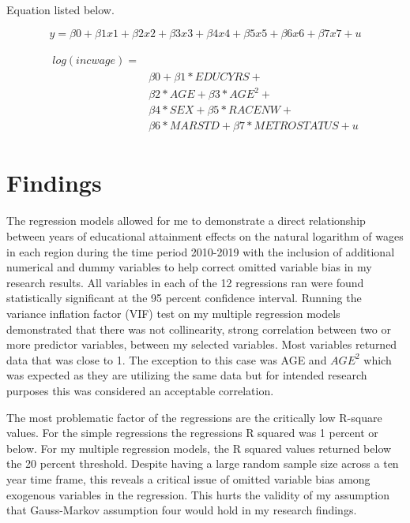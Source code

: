\documentclass[12pt, English]{article}
\begin{document}
Equation listed below. 

\begin{equation}
    y = \beta0 + \beta1x1+ \beta2x2+ \beta3x3 + \beta4x4 + \beta5x5 + \beta6x6 + \beta7x7 + u 
\end{equation}

\begin{equation}
\begin{aligned}
\begin{split}
log(incwage) = \\
&   \beta0 + \beta1*EDUCYRS + \\
&  \beta2*AGE+ \beta3*AGE^2 + \\
&  \beta4*SEX + \beta5*RACENW + \\
&  \beta6*MARSTD +\beta7*METROSTATUS + u
\end{split}
\end{aligned}
\end{equation}

\section{Findings}
The regression models allowed for me to demonstrate a direct relationship between years of educational attainment effects on the natural logarithm of wages in each region during the time period 2010-2019 with the inclusion of additional numerical and dummy variables to help correct omitted variable bias in my research results. All variables in each of the 12 regressions ran were found statistically significant at the 95 percent confidence interval. Running the variance inflation factor (VIF) test on my multiple regression models demonstrated that there was not collinearity, strong correlation between two or more predictor variables, between my selected variables. Most variables returned data that was close to 1. The exception to this case was AGE and \begin{math} AGE^2 \end{math} which was expected as they are utilizing the same data but for intended research purposes this was considered an acceptable correlation.

The most problematic factor of the regressions are the critically low R-square values. For the simple regressions the regressions R squared was 1 percent or below. For my multiple regression models, the R squared values returned below the 20 percent threshold. Despite having a large random sample size across a ten year time frame, this reveals a critical issue of omitted variable bias among exogenous variables in the regression. This hurts the validity of my assumption that Gauss-Markov assumption four would hold in my research findings. 
\end{document}
